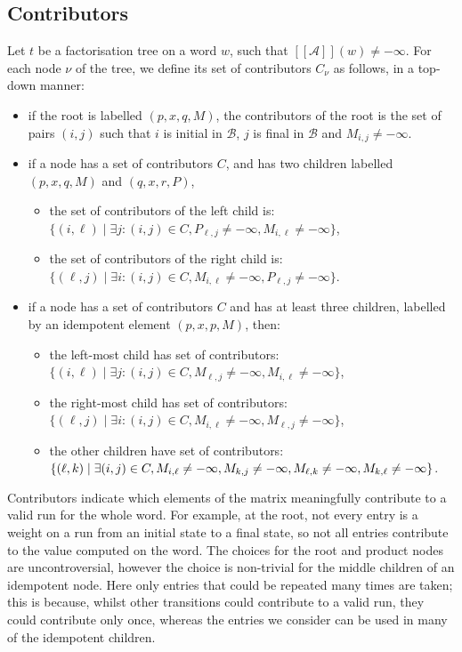 \documentclass{lmcs}
\theoremstyle{remark}
\newcommand{\autA}{\mathcal{A}}
\newcommand{\autB}{\mathcal{B}}
\newcommand{\brfunc}[1]{[\![#1]\!]}
\newcommand{\funcA}{\brfunc{\autA}}
\theoremstyle{remark}
\begin{document}
\subsection{Contributors}

Let $t$ be a factorisation tree on a word $w$, such that $\funcA(w) \neq -\infty$. For each node $\nu$ of the tree, we define its set of contributors $C_{\nu}$ as follows, in a top-down manner:
\begin{itemize}
\item if the root is labelled $(p,x,q,M)$, the contributors of the root is the set of pairs $(i,j)$ such that $i$ is initial in $\autB$, $j$ is final in $\autB$ and $M_{i,j} \neq - \infty$.
\item if a node has a set of contributors $C$, and has two children labelled $(p,x,q,M)$ and $(q,x,r,P)$,
\begin{itemize}
\item  the set of contributors of the left child is: \\
$\{(i,\ell)\mid \exists j : (i,j) \in C, P_{\ell,j} \neq -\infty, M_{i,\ell}\ne-\infty\}$,
\item  the set of contributors of the right child is:\\
$\{(\ell,j)\mid \exists i : (i,j) \in C, M_{i,\ell} \neq -\infty, P_{\ell,j}\ne-\infty\}$.
\end{itemize}
\item if a node has a set of contributors $C$ and has at least three children, labelled by an idempotent element $(p,x,p,M)$, then:
\begin{itemize}
\item the left-most child has set of contributors:\\ $\{(i,\ell)\mid\exists j: (i,j) \in C, M_{\ell,j} \neq -\infty , M_{i,\ell}\ne-\infty\}$,
\item the right-most child has set of contributors:\\ $\{(\ell,j)\mid \exists i : (i,j) \in C, M_{i,\ell} \neq -\infty, M_{\ell,j}\ne-\infty\}$,
\item the other children have set of contributors:\\
 $\{(\ell,k)\mid  \exists (i,j) \in C, M_{i,\ell} \neq -\infty, M_{k,j} \neq -\infty, \\ M_{\ell,k}\ne-\infty,M_{k,\ell}\ne-\infty\}$. 
\end{itemize}
\end{itemize}

Contributors indicate which elements of the matrix meaningfully contribute to a valid run for the whole word. For example, at the root, not every entry is a weight on a run from an initial state to a final state, so not all entries contribute to the value computed on the word. The choices for the root and product nodes are uncontroversial, however the choice is non-trivial for the middle children of an idempotent node. Here only entries that could be repeated many times are taken; this is because, whilst other transitions could contribute to a valid run, they could contribute only once, whereas the entries we consider can be used in many of the idempotent children.  
\end{document}
